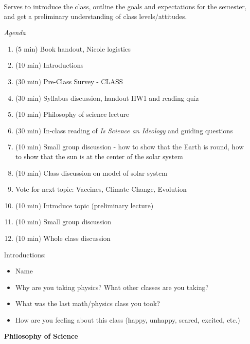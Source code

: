 \documentclass[12pt]{article}
\begin{document}
	Serves to introduce the class, outline the goals and expectations for the semester, and get a preliminary understanding of class levels/attitudes.
	
	\textit{Agenda}
	
	\begin{enumerate}
		\item (5 min) Book handout, Nicole logistics
		\item (10 min) Introductions
		\item (30 min) Pre-Class Survey - CLASS
		\item (30 min) Syllabus discussion, handout HW1 and reading quiz
		\item (10 min) Philosophy of science lecture
		\item (30 min) In-class reading of \textit{Is Science an Ideology} and guiding questions
		\item (10 min) Small group discussion - how to show that the Earth is round, how to show that the sun is at the center of the solar system
		\item (10 min) Class discussion on model of solar system
		\item Vote for next topic: Vaccines, Climate Change, Evolution
		\item (10 min) Introduce topic (preliminary lecture)
		\item (10 min) Small group discussion
		\item (10 min) Whole class discussion
	\end{enumerate}
	
Introductions:
\begin{itemize}
\item Name
\item Why are you taking physics? What other classes are you taking?
\item What was the last math/physics class you took?
\item How are you feeling about this class (happy, unhappy, scared, excited, etc.)
\end{itemize}

\begin{center}\textbf{\Large Philosophy of Science}\end{center}
\end{document}
